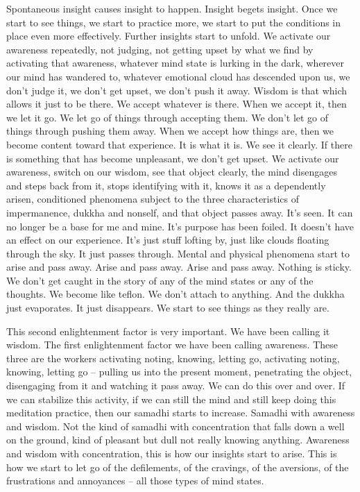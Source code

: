 \documentclass[letterpaper,10pt,english]{sphinxmanual}
\begin{document}
\sphinxAtStartPar
{}  Spontaneous insight causes insight to happen. Insight begets insight.
Once  we  start  to  see  things,  we  start  to  practice  more,  we  start  to  put  the
conditions  in  place  even  more  effectively.  Further  insights  start  to  unfold.
We activate our awareness repeatedly, not judging, not getting upset by what
we find by activating that awareness, whatever mind state is lurking in the
dark,  wherever  our  mind  has  wandered  to,  whatever  emotional  cloud  has
descended upon us, we don’t judge it, we don’t get upset, we don’t push it
away. Wisdom is that which allows it just to be there. We accept whatever
is there. When we accept it, then we let it go. We let go of things through
accepting them. We don’t let go of things through pushing them away. When
we accept how things are, then we become content toward that experience. It
is what it is. We see it clearly. If there is something that has become unpleasant, we don’t get upset. We activate our awareness, switch on our wisdom,
see  that  object  clearly,  the  mind  disengages  and  steps  back  from  it,  stops
identifying with it, knows it as a dependently arisen, conditioned phenomena
subject to the three characteristics of impermanence, dukkha and non\sphinxhyphen{}self,
and that object passes away. It’s seen. It can no longer be a base for me and
mine. It’s purpose has been foiled. It doesn’t have an effect on our experience.  It’s  just  stuff  lofting  by,  just  like  clouds  floating  through  the  sky.  It
just passes through. Mental and physical phenomena start to arise and pass
away. Arise and pass away. Arise and pass away. Nothing is sticky. We don’t
get caught in the story of any of the mind states or any of the thoughts. We
become like teflon. We don’t attach to anything. And the dukkha just evaporates. It just disappears. We start to see things as they really are.

\sphinxAtStartPar
This second enlightenment factor is very important. We have been calling it wisdom. The first enlightenment factor we have been calling awareness.
These three are the workers activating  noting,  knowing,  letting  go,  activating  noting,  knowing,  letting  go
–  pulling  us  into  the  present  moment,  penetrating  the  object,  disengaging
from it and watching it pass away. We can do this over and over. If we can
stabilize this activity, if we can still the mind and still keep doing this meditation practice, then our samadhi starts to increase. Samadhi with awareness
and wisdom. Not the kind of samadhi with concentration that falls down a
well on the ground, kind of pleasant but dull not really knowing anything.
  Awareness and wisdom with concentration, this is how our insights start to
arise. This is how we start to let go of the defilements, of the cravings, of the
aversions, of the frustrations and annoyances – all those types of mind states.
\end{document}
